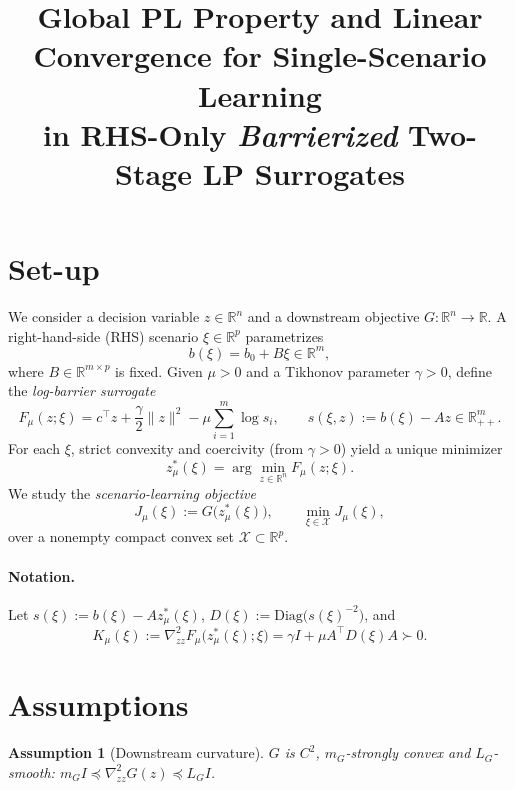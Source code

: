 \documentclass[11pt]{article}
\title{Global PL Property and Linear Convergence for Single-Scenario Learning\\
in RHS-Only \emph{Barrierized} Two-Stage LP Surrogates}
\date{}
\newtheorem{assumption}{Assumption}
\theoremstyle{remark}
\begin{document}
\maketitle

\section{Set-up}
We consider a decision variable $z\in\mathbb R^n$ and a downstream objective $G:\mathbb R^n\to\mathbb R$. 
A right-hand-side (RHS) scenario $\xi\in\mathbb R^p$ parametrizes
\begin{equation*}
b(\xi)=b_0+B\xi\in\mathbb R^m,
\end{equation*}
where $B\in\mathbb R^{m\times p}$ is fixed.
Given $\mu>0$ and a Tikhonov parameter $\gamma>0$, define the \emph{log-barrier surrogate}
\begin{equation}
\label{eq:F}
F_\mu(z;\xi)=c^\top z+\frac{\gamma}{2}\|z\|^2-\mu\sum_{i=1}^m \log s_i,
\qquad s(\xi,z):=b(\xi)-Az\in\mathbb R^m_{++}.
\end{equation}
For each $\xi$, strict convexity and coercivity (from $\gamma>0$) yield a unique minimizer
\begin{equation*}
z^*_\mu(\xi)=\arg\min_{z\in\mathbb R^n} F_\mu(z;\xi).
\end{equation*}
We study the \emph{scenario-learning objective}
\begin{equation*}
J_\mu(\xi):=G\big(z^*_\mu(\xi)\big),\qquad \min_{\xi\in\mathcal X} J_\mu(\xi),
\end{equation*}
over a nonempty compact convex set $\mathcal X\subset\mathbb R^p$.

\paragraph{Notation.}
Let $s(\xi):=b(\xi)-A z^*_\mu(\xi)$, $D(\xi):=\mathrm{Diag}\big(s(\xi)^{-2}\big)$, and
\begin{equation}
\label{eq:Kmu}
K_\mu(\xi):=\nabla^2_{zz}F_\mu\big(z^*_\mu(\xi);\xi\big)=\gamma I+\mu A^\top D(\xi)A\succ0.
\end{equation}

\section{Assumptions}
\begin{assumption}[Downstream curvature]
\label{ass:Gsc}
$G$ is $C^2$, $m_G$-strongly convex and $L_G$-smooth:
$m_G I\preceq \nabla^2_{zz}G(z)\preceq L_G I$.
\end{assumption}
\end{document}
